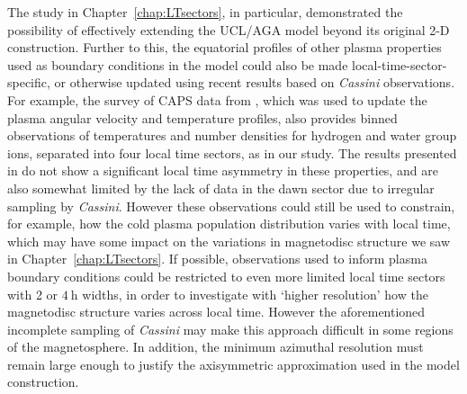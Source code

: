 The study in Chapter~\ref{chap:LTsectors}, in particular, demonstrated the possibility of effectively extending the UCL/AGA model beyond its original 2-D construction. Further to this, the equatorial profiles of other plasma properties used as boundary conditions in the model could also be made local-time-sector-specific, or otherwise updated using recent results based on \textit{Cassini} observations. For example, the survey of CAPS data from \citet{wilson2017}, which was used to update the plasma angular velocity and temperature profiles, also provides binned observations of temperatures and number densities for hydrogen and water group ions, separated into four local time sectors, as in our study. The results presented in \citet{wilson2017} do not show a significant local time asymmetry in these properties, and are also somewhat limited by the lack of data in the dawn sector due to irregular sampling by \textit{Cassini}. However these observations could still be used to constrain, for example, how the cold plasma population distribution varies with local time, which may have some impact on the variations in magnetodisc structure we saw in Chapter~\ref{chap:LTsectors}. If possible, observations used to inform plasma boundary conditions could be restricted to even more limited local time sectors with 2 or $\SI{4}{\hour}$ widths, in order to investigate with `higher resolution' how the magnetodisc structure varies across local time. However the aforementioned incomplete sampling of \textit{Cassini} may make this approach difficult in some regions of the magnetosphere. In addition, the minimum azimuthal resolution must remain large enough to justify the axisymmetric approximation used in the model construction.

